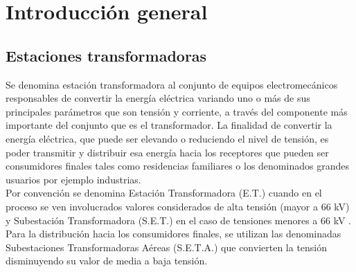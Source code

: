 \chapter{Introducción general} %

\label{Chapter1} %
\label{IntroGeneral}


\newcommand{\keyword}[1]{\textbf{#1}}
\newcommand{\tabhead}[1]{\textbf{#1}}
\newcommand{\code}[1]{\texttt{#1}}
\newcommand{\file}[1]{\texttt{\bfseries#1}}
\newcommand{\option}[1]{\texttt{\itshape#1}}
\newcommand{\grados}{$^{\circ}$}



\section{Estaciones transformadoras}

Se denomina estación transformadora al conjunto de equipos electromecánicos responsables de convertir la energía eléctrica variando uno o más de sus principales parámetros que son tensión y corriente, a través del componente más importante del conjunto que es el transformador. La finalidad de convertir la energía eléctrica, que puede ser elevando o reduciendo el nivel de tensión, es poder transmitir y distribuir esa energía hacia los receptores que pueden ser consumidores finales tales como residencias familiares o los denominados grandes usuarios por ejemplo industrias.\\

Por convención se denomina Estación Transformadora (E.T.) cuando en el proceso se ven involucrados valores considerados de alta tensión (mayor a 66 kV) y Subestación Transformadora (S.E.T.) en el caso de tensiones menores a 66 kV \citep{AEA:1}.\\
Para la distribución hacia los consumidores finales, se utilizan las denominadas Subestaciones Transformadoras Aéreas (S.E.T.A.) que convierten la tensión disminuyendo su valor de media a baja tensión.\\

